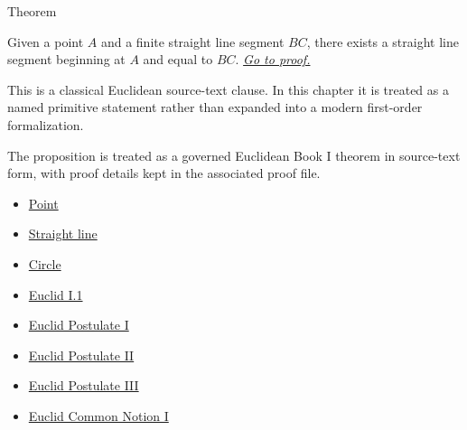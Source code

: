 \begin{theorembox}{Theorem}
\begin{theorem}
\label{thm:euclid-i-2}
\label{prop:I.2}
Given a point $A$ and a finite straight line segment $BC$, there exists a
straight line segment beginning at $A$ and equal to $BC$.
\hyperref[prf:euclid-i-2]{\textit{Go to proof.}}
\end{theorem}
\end{theorembox}

\begin{remark*}
This is a classical Euclidean source-text clause. In this chapter it is treated
as a named primitive statement rather than expanded into a modern first-order
formalization.
\end{remark*}

\begin{remark*}[Interpretation]
The proposition is treated as a governed Euclidean Book I theorem in source-text
form, with proof details kept in the associated proof file.
\end{remark*}
\begin{lra-not-visible}
\begin{dependencies}
\begin{itemize}
  \item \hyperref[def:euclid-point]{Point}
  \item \hyperref[def:euclid-straight-line]{Straight line}
  \item \hyperref[def:euclid-circle]{Circle}
  \item \hyperref[thm:euclid-i-1]{Euclid I.1}
  \item \hyperref[ax:euclid-postulate-draw-straight-line]{Euclid Postulate I}
  \item \hyperref[ax:euclid-postulate-produce-straight-line]{Euclid Postulate II}
  \item \hyperref[ax:euclid-postulate-describe-circle]{Euclid Postulate III}
  \item \hyperref[ax:euclid-common-notion-things-equal-to-same]{Euclid Common Notion I}
\end{itemize}
\end{dependencies}
\end{lra-not-visible}

